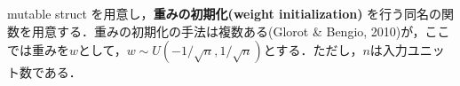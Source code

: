 mutable struct を用意し，\textbf{重みの初期化(weight initialization)} を行う同名の関数を用意する．重みの初期化の手法は複数ある(Glorot & Bengio, 2010)が，ここでは重みを$w$として，$w \sim U\left(-1/\sqrt{n}, 1/\sqrt{n}\right)$とする．ただし，$n$は入力ユニット数である．
